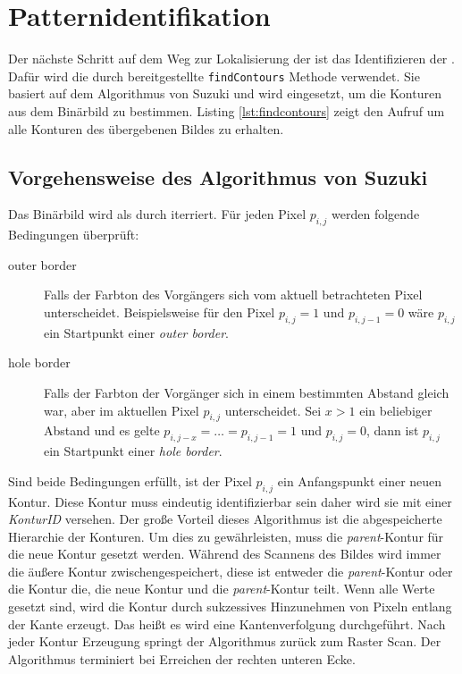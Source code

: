 \chapter{Patternidentifikation}
Der nächste Schritt auf dem Weg zur Lokalisierung der \QRCodes ist das Identifizieren der \fps. Dafür wird die durch \OpenCV bereitgestellte \texttt{findContours} Methode verwendet. Sie basiert auf dem Algorithmus von Suzuki und wird eingesetzt, um die Konturen aus dem Binärbild zu bestimmen.
Listing \ref{lst:findcontours} zeigt den Aufruf um alle Konturen des übergebenen Bildes zu erhalten.

\section{Vorgehensweise des Algorithmus von Suzuki} \label{suzuki}
Das Binärbild wird als durch iterriert. Für jeden Pixel $p_{i,j}$ werden folgende Bedingungen überprüft:
\begin{description}
	\item[outer border] Falls der Farbton des Vorgängers sich vom aktuell betrachteten Pixel unterscheidet. Beispielsweise für den Pixel $p_{i,j} = 1$ und $p_{i,j-1} = 0$ wäre $p_{i,j}$ ein Startpunkt einer \emph{outer border}. 
	\item[hole border] Falls der Farbton der Vorgänger sich in einem bestimmten Abstand gleich war, aber im aktuellen Pixel $p_{i,j}$ unterscheidet. Sei $x > 1$ ein beliebiger Abstand und es gelte $p_{i,j-x} =\ldots = p_{i,j-1}= 1$ und $p_{i,j} = 0$, dann ist $p_{i,j}$ ein Startpunkt einer \emph{hole border}.
\end{description}
Sind beide Bedingungen erfüllt, ist der Pixel $p_{i,j}$ ein Anfangspunkt einer neuen Kontur. Diese Kontur muss eindeutig identifizierbar sein daher wird sie mit einer \emph{KonturID} versehen. Der große Vorteil dieses Algorithmus ist die abgespeicherte Hierarchie der Konturen. Um dies zu gewährleisten, muss die \emph{parent}-Kontur für die neue Kontur gesetzt werden. Während des Scannens des Bildes wird immer die äußere Kontur zwischengespeichert, diese ist entweder die \emph{parent}-Kontur oder die Kontur die, die neue Kontur und die \emph{parent}-Kontur teilt. Wenn alle Werte gesetzt sind, wird die Kontur durch sukzessives Hinzunehmen von Pixeln entlang der Kante erzeugt. Das heißt es wird eine Kantenverfolgung durchgeführt. Nach jeder Kontur Erzeugung springt der Algorithmus zurück zum Raster Scan. Der Algorithmus terminiert bei Erreichen der rechten unteren Ecke.

